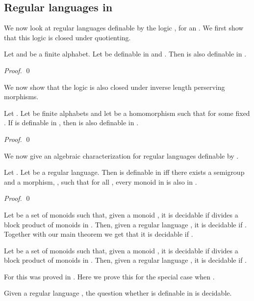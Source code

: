 \documentclass[envcountsame]{llncs}
\begin{document}
\subsection{Regular languages in }
We now look at regular languages definable by the logic , for an . We first show that this logic is closed under quotienting.

\begin{lemma} \label{lem_qnt}
Let  and  be a finite alphabet. Let  be definable in  and . Then  is also definable in .
\end{lemma}
\begin{proof}
\qed \end{proof}

We now show that the logic is also closed under inverse length perserving morphisms.
\begin{lemma} \label{lem_morph}
Let . Let  be finite alphabets and let  be a homomorphism such that  for some fixed . If  is definable in , then  is also definable in .
\end{lemma}
\begin{proof}
\qed \end{proof}

We now give an algebraic characterization for regular languages definable by . 
\begin{theorem}
Let . Let  be a regular language. Then  is definable in  iff there exists a semigroup  and a morphism, , such that for all , every monoid in  is also in .
\end{theorem}
\begin{proof}

\qed \end{proof}


Let  be a set of monoids such that, given a monoid , it is decidable if  divides a block product of monoids in . 
Then, given a regular language , it is decidable if .
Together with our main theorem we get that it is decidable if .

\begin{corollary}
Let  be a set of monoids such that, given a monoid , it is decidable if  divides a block product of monoids in
. Then, given a regular language , it is decidable if .
\end{corollary}

For  this was proved in \cite{roy_defGenFO}. Here we prove this for the special case when .
\begin{corollary}
Given a regular language , the question whether  is definable in  is decidable.
\end{corollary}
\end{document}
